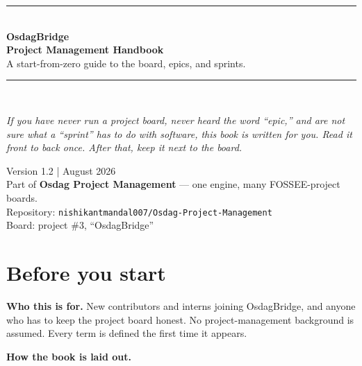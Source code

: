 \documentclass[11pt,a4paper]{report}
\newcommand{\code}[1]{\texttt{#1}}
\begin{document}
\begin{titlepage}
\centering
\vspace*{2.2cm}
{\color{brandblue}\rule{\textwidth}{2pt}}\\[10pt]
{\Huge\bfseries\color{ink} OsdagBridge}\\[6pt]
{\Huge\bfseries\color{ink} Project Management Handbook}\\[14pt]
{\large A start-from-zero guide to the board, epics, and sprints.}\\[6pt]
{\color{brandblue}\rule{\textwidth}{2pt}}\\[26pt]

\begin{minipage}{0.82\textwidth}\centering\itshape
If you have never run a project board, never heard the word ``epic,'' and are not
sure what a ``sprint'' has to do with software, this book is written for you.
Read it front to back once. After that, keep it next to the board.
\end{minipage}

\vfill
{\large Version 1.2 \quad| August 2026}\\[4pt]
{\small Part of \textbf{Osdag Project Management} --- one engine, many FOSSEE-project boards.}\\[2pt]
{\small Repository: \code{nishikantmandal007/Osdag-Project-Management}}\\[2pt]
{\small Board: project \#3, ``OsdagBridge''}
\vspace*{1.5cm}
\end{titlepage}

\tableofcontents
\thispagestyle{empty}
\cleardoublepage

\chapter*{Before you start}

\textbf{Who this is for.} New contributors and interns joining OsdagBridge, and
anyone who has to keep the project board honest. No project-management background
is assumed. Every term is defined the first time it appears.

\textbf{How the book is laid out.}
\end{document}
